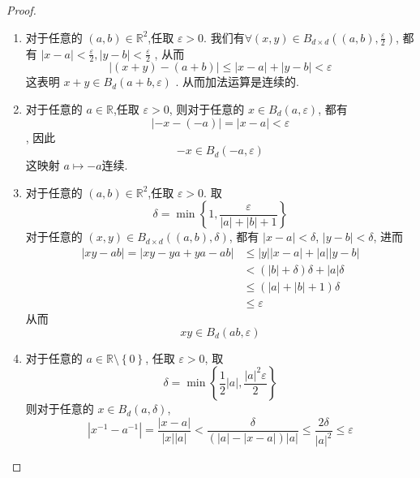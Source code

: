 \documentclass[../main.tex]{subfiles}
\begin{document}
\begin{proof}
  \begin{enumerate}
    \item 对于任意的 \(  \left( a,b \right)\in \mathbb{R} ^{2}   \),任取 \(   \varepsilon > 0  \). 我们有\(   \forall \left( x,y \right) \in B_{d\times d}\left( \left( a,b \right),\frac{ \varepsilon }{2 }   \right)  \), 都有 \(  \left| x-a \right|< \frac{ \varepsilon  }{2 },  \left| y-b \right|< \frac{ \varepsilon  }{2 }       \) , 从而 \[
    \left| \left( x+ y \right)-\left( a+ b \right)   \right|\le \left| x-a \right|+ \left| y-b \right|<  \varepsilon     
    \]这表明 \(  x+ y \in B_{d}\left( a+ b, \varepsilon  \right)   \) . 从而加法运算是连续的.
    \item 对于任意的 \(  a \in \mathbb{R}  \),任取 \(   \varepsilon > 0  \), 则对于任意的 \(  x \in B_{d}\left( a,  \varepsilon  \right)   \), 都有\[
    \left| -x-\left( -a \right)  \right|= \left| x-a \right|<  \varepsilon   
    \], 因此 \[
    -x \in B_{d}\left( -a, \varepsilon  \right) 
    \]这映射 \(  a\mapsto -a  \)连续.
    \item 对于任意的 \(  \left( a,b \right)\in \mathbb{R} ^{2}   \),任取 \(   \varepsilon > 0  \). 取 \[
     \delta = \min \left\{ 1, \frac{ \varepsilon  }{\left| a \right|+ \left| b \right|+ 1   }  \right\}
    \]对于任意的 \(  \left( x,y \right)\in B_{d\times d}\left( \left( a,b \right), \delta   \right)     \), 都有 \(  \left| x-a \right|<  \delta    \), \(  \left| y-b \right|<  \delta    \), 进而   \[
    \begin{aligned}
    \left| xy-ab \right|=  \left| xy-ya+ ya-ab \right|&\le \left| y \right|\left| x-a \right|+ \left| a \right|\left| y-b \right|    \\ 
     &<  \left( \left| b \right|+  \delta   \right) \delta + \left| a \right| \delta \\ 
      & \le  \left( \left| a \right|+ \left| b \right|+ 1   \right)   \delta \\ 
       &\le  \varepsilon 
    \end{aligned}
    \]从而 \[
    xy \in B_{d}\left( ab,  \varepsilon  \right) 
    \]
    \item  对于任意的 \( a \in \mathbb{R} \setminus \left\{ 0 \right\}\), 任取 \(   \varepsilon > 0  \),  取 \[
     \delta = \min \left\{ \frac{1 }{2 }\left| a \right|, \frac{\left| a \right|^{2}   \varepsilon }{2 }    \right\}
    \]则对于任意的 \(  x\in B_{d}\left( a ,  \delta   \right)   \),  \[
    \left| x^{-1} -a^{-1}  \right|= \frac{\left| x-a \right|  }{\left| x \right|\left| a \right|   }  < \frac{ \delta  }{\left( \left| a \right|-\left| x-a \right|   \right) \left| a \right|  }\le \frac{ 2\delta  }{\left| a \right|^{2}   }  \le  \varepsilon 
\]
\end{enumerate}
\end{proof}
\end{document}
